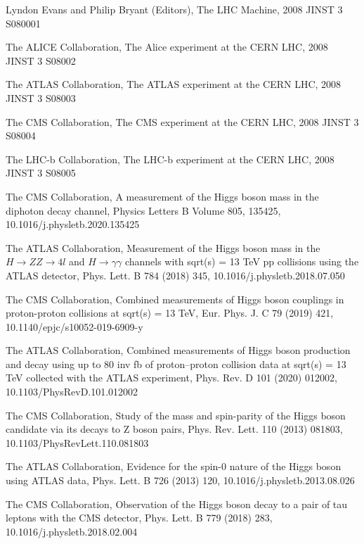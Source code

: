 \begin{thebibliography}{20}
  {Lyndon Evans and Philip Bryant (Editors), The LHC Machine, 2008 JINST 3 S080001}
  
  {The ALICE Collaboration, The Alice experiment at the CERN LHC, 2008 JINST 3 S08002}
  
  {The ATLAS Collaboration, The ATLAS experiment at the CERN LHC, 2008 JINST 3 S08003}
  
  {The CMS Collaboration, The CMS experiment at the CERN LHC, 2008 JINST 3 S08004}
  
  {The LHC-b Collaboration, The LHC-b experiment at the CERN LHC, 2008 JINST 3 S08005}
  
  {The CMS Collaboration, A measurement of the Higgs boson mass in the diphoton decay channel, Physics Letters B Volume 805, 135425, 10.1016/j.physletb.2020.135425}
 
  {The ATLAS Collaboration, Measurement of the Higgs boson mass in the $H\rightarrow ZZ\rightarrow 4l$ and $H\rightarrow\gamma\gamma$ channels with sqrt(s) = 13 TeV pp collisions using the ATLAS detector, Phys. Lett. B 784 (2018) 345, 10.1016/j.physletb.2018.07.050}
 
 {The CMS Collaboration, Combined measurements of Higgs boson couplings in proton-proton collisions at sqrt(s) = 13 TeV, Eur. Phys. J. C 79 (2019) 421, 10.1140/epjc/s10052-019-6909-y}
  
 {The ATLAS Collaboration, Combined measurements of Higgs boson production and decay using up to 80 inv fb of proton--proton collision data at sqrt(s) = 13 TeV collected with the ATLAS experiment, Phys. Rev. D 101 (2020) 012002, 10.1103/PhysRevD.101.012002}
 
  {The CMS Collaboration, Study of the mass and spin-parity of the Higgs boson candidate via its decays to Z boson pairs, Phys. Rev. Lett. 110 (2013) 081803, 10.1103/PhysRevLett.110.081803}
 
  {The ATLAS Collaboration, Evidence for the spin-0 nature of the Higgs boson using ATLAS data, Phys. Lett. B 726 (2013) 120, 10.1016/j.physletb.2013.08.026}

  {The CMS Collaboration, Observation of the Higgs boson decay to a pair of tau leptons with the CMS detector, Phys. Lett. B 779 (2018) 283, 10.1016/j.physletb.2018.02.004}
  

\end{thebibliography}
